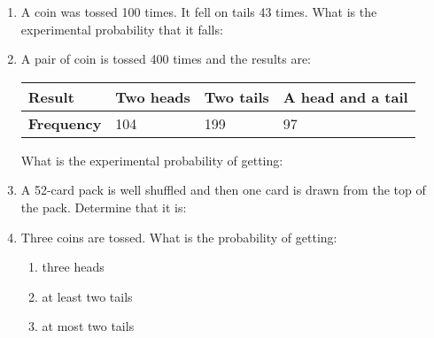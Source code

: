 \begin{enumerate} 
\item A coin was tossed 100 times. It fell on tails 43 times. What is the experimental probability that it falls: 
\begin{enumerate}
\end{enumerate}   
\item A pair of coin is tossed 400 times and the results are:

\begin{center}
\noindent\begin{minipage}{0.45\textwidth}
\begin{tabularx}{\textwidth}{|Y|Y|Y|Y|}
\hline
\textbf{Result} & Two heads & Two tails & A head and a tail\\
\hline
\textbf{Frequency} & 104 & 199 & 97\\
\hline
\end{tabularx} 
\end{minipage}
\end{center} 

What is the experimental probability of getting: 
\begin{enumerate}
\end{enumerate} 

\item A 52-card pack is well shuffled and then one card is drawn from the top of the pack. Determine that it is: 
\begin{enumerate}
\end{enumerate} 

\item Three coins are tossed. What is the probability of getting:
\begin{multicols}{3}
\begin{enumerate}
\item three heads
\item at least two tails
\item at most two tails

\end{enumerate} 
\end{multicols} 

\end{enumerate}  



